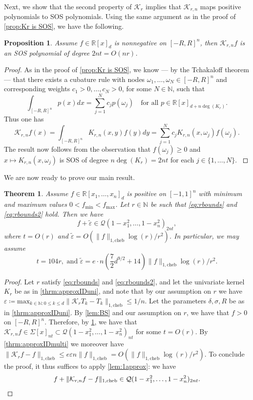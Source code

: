 \documentclass[11pt]{article}
\newcommand{\N}{\mathbb{N}}
\newcommand{\R}{\mathbb{R}}
\renewcommand{\min}{\mathrm{min}}
\renewcommand{\max}{\mathrm{max}}
\renewcommand{\epsilon}{\varepsilon}
\newcommand{\eps}{\epsilon}
\newtheorem{proposition}[defin]{Proposition}
\newtheorem{theorem}{Theorem}
\theoremstyle{definition}
\newcommand{\cheb}{{1,\mathrm{cheb}}}
\begin{document}
Next, we show that the second property of $\mathcal K_r$ implies that $\mathcal K_{r,n}$ maps positive polynomials to SOS polynomials.
 Using the same argument as in the proof of  \cref{prop:Kr is SOS}, we have the following.

\begin{proposition} \label{prop:prod Kr is SOS}
Assume $f \in \R[x]_d$ is nonnegative on $[-R,R]^n$, then $\mathcal{K}_{r,n} f$ is an SOS polynomial of degree $2nt = O(nr)$.
\end{proposition}
\begin{proof}
{
As in the proof of  \cref{prop:Kr is SOS}, we know --- by the Tchakaloff theorem \cite{Tchakaloff} --- that there exists a cubature rule with
nodes $\omega_1,\ldots,\omega_N \in [-R,R]^n$ and corresponding weights $c_1>0, \ldots, c_N >0$, for some $N \in \N$, such that
\[
\int_{[-R,R]^n} p(x)dx = \sum_{j=1}^N c_jp(\omega_j) \quad \mbox{for all } p \in \R[x]_{d + n\deg(K_r)}.
\]
Thus one has
\[
\mathcal K_{r,n} f(x) = \int_{[-R,R]^n} K_{r,n}(x,y) f(y) dy = \sum_{j=1}^N c_jK_{r,n}(x,\omega_j)f(\omega_j).
\]
The result now follows from the observation that $f(\omega_j) \ge 0$ and $x \mapsto K_{r,n}(x,\omega_j)$ is SOS of degree $n\deg(K_r) = 2nt$ for each $j \in \{1,\ldots,N\}$.
}
\end{proof}

We are now ready to prove our main result.


\begin{theorem}
\label{thrm:main multi}
Assume $f \in \R[x_1,\ldots,x_n]_d$ is positive on $[-1,1]^n$ with minimum and maximum values $0 < f_\min <f_\max$. Let $r \in \N$ be such that \eqref{eq:rbounds} and \eqref{eq:rbounds2} hold. Then we have
\[
f + \widetilde \eps  \in \mathcal Q(1-x_1^2,\ldots,1-x_n^2)_{2nt},
\]
where $t=O(r)$ and $\widetilde \eps = O(\|f\|_\cheb \log(r)/r^2)$.
In particular, we may assume
\[
t = {104r}, \mbox{ and }
\tilde\eps = e\cdot n\left( {\frac{7}{2}d^{9/2}} + 14\right)\|f\|_\cheb \log(r)/r^2.
\]
\end{theorem}
\begin{proof}
Let $r $ satisfy \eqref{eq:rbounds} and \eqref{eq:rbounds2}, and let the univariate kernel $K_r$ be as in \cref{thrm:approxIDuni}, and note that by our assumption on $r$ we have $\eps \coloneqq \max_{k \in \N: 0\leq k \leq d} \|\mathcal K_r T_k - T_k\|_\cheb \leq 1/n$. Let the parameters $\delta, \sigma, R$ be as in \cref{thrm:approxIDuni}.
By \cref{lem:BS} and our assumption on $r$, we have that $f>0$ on $[-R,R]^n$.
Therefore, by \cref{prop:prod Kr is SOS}, we have that ${\mathcal K_{r,n} f \in \Sigma[x]_{nt} \subset \mathcal Q(1-x_1^2,\ldots, 1-x_n^2)_{nt}}$
 for some $t = O(r)$. By \cref{thrm:approxIDmulti} we moreover have $\|\mathcal K_r f-f\|_\cheb \leq e\eps n \|f\|_\cheb = O(\|f\|_\cheb \log(r)/r^2)$. To conclude the proof, it thus suffices to apply \cref{lem:1approx}: we have
\[
f + \|\mathcal K_{r,n} f-f\|_\cheb \in \mathcal Q(1-x_1^2,\ldots,1-x_n^2)_{2nt}. \qedhere
\]
\end{proof}
\end{document}
